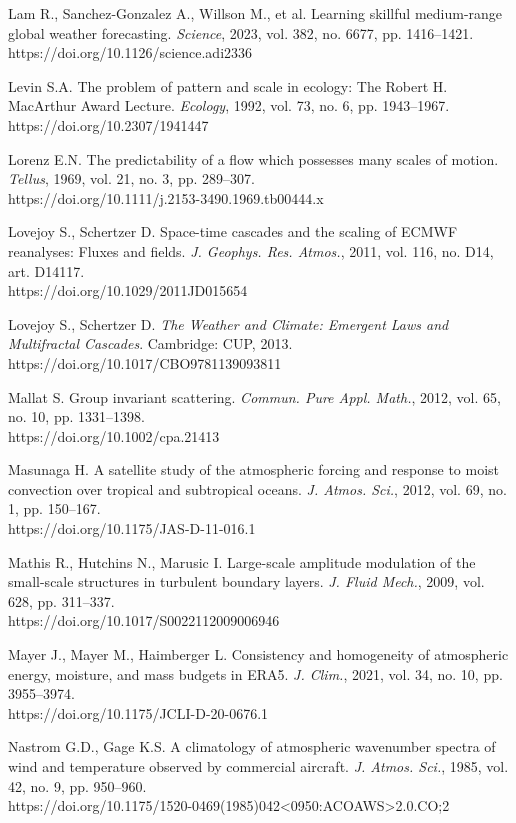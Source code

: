 \documentclass[12pt,a4paper]{article}
\begin{document}
\noindent Lam R., Sanchez-Gonzalez A., Willson M., et al. Learning skillful medium-range global weather forecasting. \textit{Science}, 2023, vol. 382, no. 6677, pp. 1416–1421.\\ https://doi.org/10.1126/science.adi2336

\noindent Levin S.A. The problem of pattern and scale in ecology: The Robert H. MacArthur Award Lecture. \textit{Ecology}, 1992, vol. 73, no. 6, pp. 1943–1967.\\ https://doi.org/10.2307/1941447

\noindent Lorenz E.N. The predictability of a flow which possesses many scales of motion. \textit{Tellus}, 1969, vol. 21, no. 3, pp. 289–307.\\ https://doi.org/10.1111/j.2153-3490.1969.tb00444.x

\noindent Lovejoy S., Schertzer D. Space-time cascades and the scaling of ECMWF reanalyses: Fluxes and fields. \textit{J. Geophys. Res. Atmos.}, 2011, vol. 116, no. D14, art. D14117.\\ https://doi.org/10.1029/2011JD015654

\noindent Lovejoy S., Schertzer D. \textit{The Weather and Climate: Emergent Laws and Multifractal Cascades}. Cambridge: CUP, 2013.\\ https://doi.org/10.1017/CBO9781139093811

\noindent Mallat S. Group invariant scattering. \textit{Commun. Pure Appl. Math.}, 2012, vol. 65, no. 10, pp. 1331–1398.\\ https://doi.org/10.1002/cpa.21413

\noindent Masunaga H. A satellite study of the atmospheric forcing and response to moist convection over tropical and subtropical oceans. \textit{J. Atmos. Sci.}, 2012, vol. 69, no. 1, pp. 150–167.\\ https://doi.org/10.1175/JAS-D-11-016.1

\noindent Mathis R., Hutchins N., Marusic I. Large-scale amplitude modulation of the small-scale structures in turbulent boundary layers. \textit{J. Fluid Mech.}, 2009, vol. 628, pp. 311–337.\\ https://doi.org/10.1017/S0022112009006946

\noindent Mayer J., Mayer M., Haimberger L. Consistency and homogeneity of atmospheric energy, moisture, and mass budgets in ERA5. \textit{J. Clim.}, 2021, vol. 34, no. 10, pp. 3955–3974.\\ https://doi.org/10.1175/JCLI-D-20-0676.1

\noindent Nastrom G.D., Gage K.S. A climatology of atmospheric wavenumber spectra of wind and temperature observed by commercial aircraft. \textit{J. Atmos. Sci.}, 1985, vol. 42, no. 9, pp. 950–960.\\ https://doi.org/10.1175/1520-0469(1985)042<0950:ACOAWS>2.0.CO;2
\end{document}
